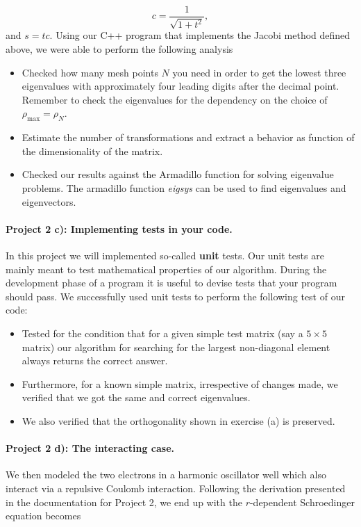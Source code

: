 \documentclass[10pt,showpacs,preprintnumbers,footinbib,amsmath,amssymb,aps,prl,twocolumn,groupedaddress,superscriptaddress,showkeys]{revtex4-1}
\begin{document}
\begin{equation*}
   c = \frac{1}{\sqrt{1+t^2}},
\end{equation*}
and $s=tc$.  
Using our C++ program that implements the Jacobi method defined above, we were able to perform the following analysis
\begin{itemize}
\item Checked how many mesh points $N$ you need in order to get the lowest three eigenvalues with approximately four leading digits after the decimal point. Remember to check the eigenvalues for the dependency on the choice of $\rho_{\mathrm{max}}=\rho_N$.

\item Estimate the number of transformations and extract a behavior as function
of the dimensionality of the matrix.

\item Checked our results against the Armadillo function for solving 
eigenvalue problems. The armadillo function \emph{eigsys} can be used to find eigenvalues and eigenvectors.
\end{itemize}

\paragraph{Project 2 c): Implementing tests in your code.}
In this project  we will implemented so-called \textbf{unit} tests. Our unit tests are mainly meant to test mathematical properties of our algorithm. During the development phase of a program it is useful to devise tests that your program should pass. We successfully used unit tests to perform the following test of our code:
\begin{itemize}
\item Tested for the condition that for a given simple test matrix (say a $5\times 5$ matrix) our algorithm for searching for the largest non-diagonal element always returns the correct answer.
\item Furthermore, for a known simple matrix, irrespective of changes made, we verified that we got the same and correct eigenvalues. 
\item We also verified that the orthogonality shown in exercise (a) is preserved. \end{itemize}


\paragraph{Project 2 d): The interacting case.}
We then modeled the two electrons in a harmonic oscillator well which
also interact via a repulsive Coulomb interaction. Following the derivation presented in the documentation for Project 2, we end up with
 the $r$-dependent Schroedinger equation becomes
\end{document}
